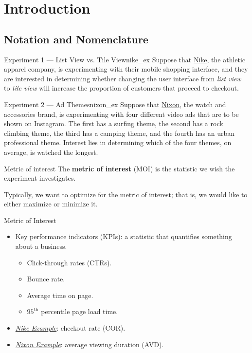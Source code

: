 \chapter{Introduction}
\section{Notation and Nomenclature}
\begin{Example}{Experiment 1 --- List View vs. Tile View}{nike_ex}
    Suppose that \href{https://www.nike.com/ca/}{Nike}, the athletic apparel company,
    is experimenting with their mobile shopping interface, and they are interested in determining
    whether changing the user interface from \emph{list view}
    to \emph{tile view} will increase the proportion
    of customers that proceed to checkout.
\end{Example}
\begin{Example}{Experiment 2 --- Ad Themes}{nixon_ex}
    Suppose that \href{https://www.nixon.com/ca/en}{Nixon},
    the watch and accessories brand, is experimenting
    with four different video ads that are to be shown on Instagram.
    The first has a surfing theme, the second has a rock climbing theme, the third
    has a camping theme, and the fourth has an urban professional theme.
    Interest lies in determining which of the four themes, on average,
    is watched the longest.
\end{Example}
\begin{Definition}{Metric of interest}{}
    The \textbf{metric of interest} (MOI) is the statistic we wish
    the experiment investigates.
\end{Definition}
\begin{Remark}{}{}
    Typically, we want to optimize for the metric of interest; that is,
    we would like to either maximize or minimize it.
\end{Remark}
\begin{Example}{Metric of Interest}{}
    \begin{itemize}
        \item Key performance indicators (KPIs): a statistic that
              quantifies something about a business.
              \begin{itemize}
                  \item Click-through rates (CTRs).
                  \item Bounce rate.
                  \item Average time on page.
                  \item $ 95^{\text{th}} $ percentile page load time.
              \end{itemize}
        \item \emph{\hyperref[ex:nike_ex]{Nike Example}}: checkout rate (COR).
        \item \emph{\hyperref[ex:nixon_ex]{Nixon Example}}: average viewing duration (AVD).
    \end{itemize}
\end{Example}
